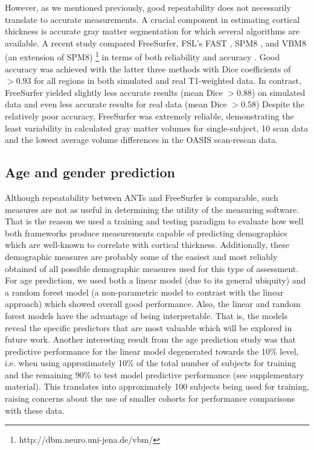 However, as we mentioned previously, good repeatability
does not necessarily translate to accurate measurements.  
A crucial component in estimating cortical thickness is accurate
gray matter segmentation for which several algorithms are available.
A recent study compared FreeSurfer, FSL's FAST \citep{zhang2001},
SPM8 \citep{ashburner2005}, and VBM8 (an extension of SPM8)%
\footnote{
http://dbm.neuro.uni-jena.de/vbm/
}
in terms of both reliability and accuracy \cite{eggert2012}.  
Good accuracy was achieved with the latter three methods with 
Dice coefficients of $>0.93$ for all regions 
in both simulated and real T1-weighted data.  In contrast, FreeSurfer
yielded slightly less accurate results  (mean Dice $> 0.88$) on simulated 
data and even less accurate results for real data (mean Dice $> 0.58$)
Despite the relatively poor accuracy, FreeSurfer was extremely reliable,
demonstrating the least variability in calculated gray matter volumes 
for single-subject, 10 scan data and the lowest average volume
differences in the OASIS scan-rescan data.

\subsection{Age and gender prediction} 
Although repeatability between ANTs and FreeSurfer is comparable,
such measures are not as useful in determining the utility of the 
measuring software.  That is the reason we used 
a training and testing paradigm to evaluate how well both frameworks produce measurements capable of predicting demographics which are well-known to correlate
with cortical thickness.  Additionally, these demographic measures are
probably some of the easiest and most reliably obtained of all possible
demographic measures used for this type of assessment.  For age prediction,
we used both a linear model (due to its general ubiquity) and a random
forest model (a non-parametric model to contrast with the linear approach)
which showed overall good performance.  Also, the linear  and
random forest models have the advantage of being
interpretable.  That is, the models reveal the specific predictors
that are most valuable which will be explored in future work.  
Another interesting result from the age prediction study was that 
predictive performance for the linear model degenerated towards the 10\% level, i.e. 
when using approximately 10\% of the total number of subjects for 
training and the remaining 90\% to test model predictive performance 
(see supplementary material).
This translates into approximately 100 subjects being used for training,
raising concerns about the use of smaller cohorts for performance comparisons
with these data.

